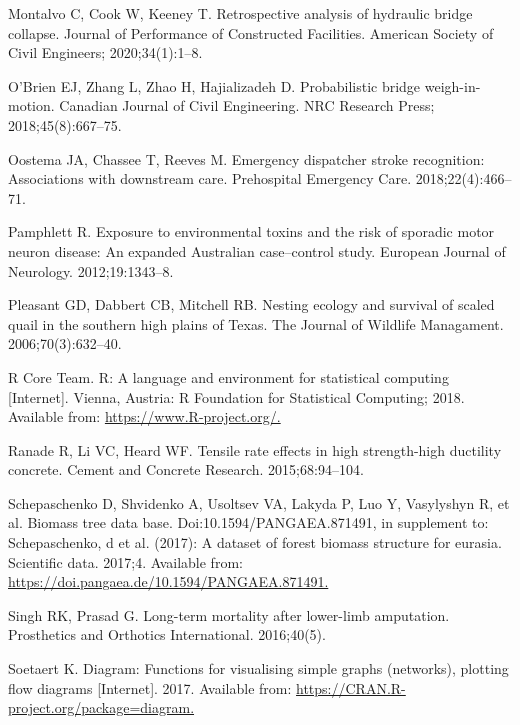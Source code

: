 \documentclass[
  11pt,
  a4paper,
  krantz2]{krantz}
\newlength{\cslhangindent}
\newenvironment{CSLReferences}[2] %
 {\begin{list}{}{%
  \setlength{\itemindent}{0pt}
  \setlength{\leftmargin}{0pt}
  \setlength{\parsep}{0pt}
  \ifodd #1
   \setlength{\leftmargin}{\cslhangindent}
   \setlength{\itemindent}{-1\cslhangindent}
  \fi
  \setlength{\itemsep}{#2\baselineskip}}}
 {\end{list}}
\begin{document}
\begin{footnotesize}
\begin{CSLReferences}{1}{0}
Montalvo C, Cook W, Keeney T. Retrospective analysis of hydraulic bridge collapse. Journal of Performance of Constructed Facilities. American Society of Civil Engineers; 2020;34(1):1--8.

O'Brien EJ, Zhang L, Zhao H, Hajializadeh D. Probabilistic bridge weigh-in-motion. {C}anadian Journal of Civil Engineering. NRC Research Press; 2018;45(8):667--75.

Oostema JA, Chassee T, Reeves M. Emergency dispatcher stroke recognition: Associations with downstream care. Prehospital Emergency Care. 2018;22(4):466--71.

Pamphlett R. Exposure to environmental toxins and the risk of sporadic motor neuron disease: An expanded {A}ustralian case--control study. {E}uropean Journal of Neurology. 2012;19:1343--8.

Pleasant GD, Dabbert CB, Mitchell RB. Nesting ecology and survival of scaled quail in the southern high plains of {T}exas. The Journal of Wildlife Managament. 2006;70(3):632--40.

R Core Team. {R}: A language and environment for statistical computing {[}Internet{]}. Vienna, Austria: R Foundation for Statistical Computing; 2018. Available from: \href{https://www.R-project.org/}{https://www.R-project.org/.}

Ranade R, Li VC, Heard WF. Tensile rate effects in high strength-high ductility concrete. Cement and Concrete Research. 2015;68:94--104.

Schepaschenko D, Shvidenko A, Usoltsev VA, Lakyda P, Luo Y, Vasylyshyn R, et al. Biomass tree data base. Doi:10.1594/PANGAEA.871491, in supplement to: Schepaschenko, d et al. (2017): A dataset of forest biomass structure for eurasia. Scientific data. 2017;4. Available from: \href{https://doi.pangaea.de/10.1594/PANGAEA.871491}{https://doi.pangaea.de/10.1594/PANGAEA.871491.}

Singh RK, Prasad G. Long-term mortality after lower-limb amputation. Prosthetics and Orthotics International. 2016;40(5).

Soetaert K. Diagram: Functions for visualising simple graphs (networks), plotting flow diagrams {[}Internet{]}. 2017. Available from: \href{https://CRAN.R-project.org/package=diagram}{https://CRAN.R-project.org/package=diagram.}


\end{CSLReferences}
\end{footnotesize}
\end{document}
